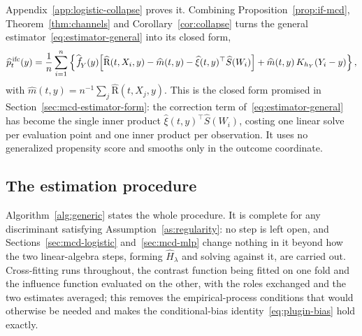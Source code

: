 \documentclass[11pt]{article}
\theoremstyle{plain}
\theoremstyle{definition}
\theoremstyle{remark}
\newcommand{\pfhat}[1]{\ensuremath{\,\mathlarger{\widehat{\textit{f}}}_{#1}}}
\newcommand{\DensityRatio}{\text{R}}
\newcommand{\score}{S}
\begin{document}
Appendix~\ref{app:logistic-collapse} proves it. Combining Proposition~\ref{prop:if-mcd},
Theorem~\ref{thm:channels} and Corollary~\ref{cor:collapse} turns the general
estimator~\eqref{eq:estimator-general} into its closed form,
\begin{equation}
\widehat p^{\,\mathrm{ifc}}_t(y)
= \frac{1}{n}\sum_{i=1}^{n} \left\{
\pfhat{Y}(y)\Big[
\widehat{\DensityRatio}(t,X_i,y) - \widehat m(t,y)
- \widehat\xi(t,y)^\top \widehat\score(W_i)
\Big]
+ \widehat m(t,y)\, K_{h_Y}(Y_i - y)
\right\},
\label{eq:estimator}
\end{equation}
with $\widehat m(t,y) = n^{-1}\sum_{j} \widehat{\DensityRatio}(t,X_j,y)$. This is the closed
form promised in Section~\ref{sec:mcd-estimator-form}: the correction term
of~\eqref{eq:estimator-general} has become the single inner product
$\widehat\xi(t,y)^\top\widehat\score(W_i)$, costing one linear solve per evaluation point and
one inner product per observation. It uses no generalized propensity score and smooths only in
the outcome coordinate.

\subsection{The estimation procedure}
\label{sec:mcd-algorithm-generic}

Algorithm~\ref{alg:generic} states the whole procedure. It is complete for any discriminant
satisfying Assumption~\ref{as:regularity}: no step is left open, and
Sections~\ref{sec:mcd-logistic} and~\ref{sec:mcd-mlp} change nothing in it beyond how the two
linear-algebra steps, forming $\widehat H_\lambda$ and solving against it, are carried out.
Cross-fitting \citep{chernozhukov2018} runs throughout, the contrast function being fitted on
one fold and the influence function evaluated on the other, with the roles exchanged and the
two estimates averaged; this removes the empirical-process conditions that would otherwise be
needed and makes the conditional-bias identity~\eqref{eq:plugin-bias} hold exactly.
\end{document}
